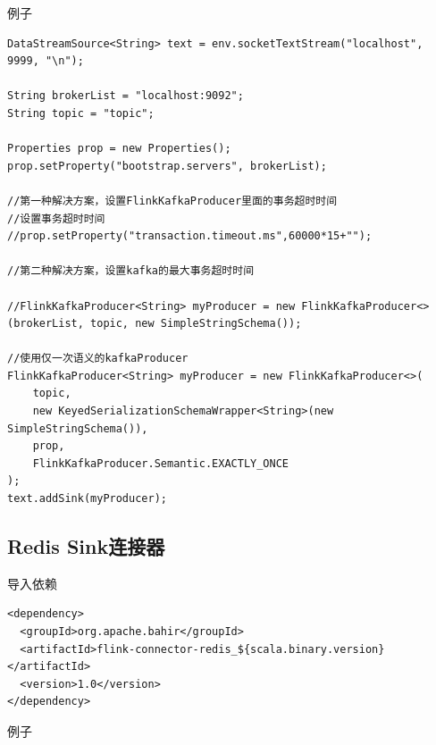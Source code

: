\documentclass[cn,11pt,chinese]{elegantbook}
\begin{document}
例子

\begin{verbatim}
DataStreamSource<String> text = env.socketTextStream("localhost", 9999, "\n");

String brokerList = "localhost:9092";
String topic = "topic";

Properties prop = new Properties();
prop.setProperty("bootstrap.servers", brokerList);

//第一种解决方案，设置FlinkKafkaProducer里面的事务超时时间
//设置事务超时时间
//prop.setProperty("transaction.timeout.ms",60000*15+"");

//第二种解决方案，设置kafka的最大事务超时时间

//FlinkKafkaProducer<String> myProducer = new FlinkKafkaProducer<>(brokerList, topic, new SimpleStringSchema());

//使用仅一次语义的kafkaProducer
FlinkKafkaProducer<String> myProducer = new FlinkKafkaProducer<>(
    topic,
    new KeyedSerializationSchemaWrapper<String>(new SimpleStringSchema()),
    prop,
    FlinkKafkaProducer.Semantic.EXACTLY_ONCE
);
text.addSink(myProducer);
\end{verbatim}

\subsection{Redis Sink连接器}

导入依赖

\begin{verbatim}
<dependency>
  <groupId>org.apache.bahir</groupId>
  <artifactId>flink-connector-redis_${scala.binary.version}</artifactId>
  <version>1.0</version>
</dependency>
\end{verbatim}

例子
\end{document}
